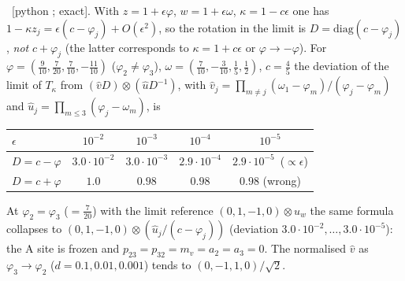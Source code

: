 \ex\ [python ; exact]. With $z=1+\epsilon\varphi$, $w=1+\epsilon\omega$, $\kappa=1-c\epsilon$ one has $1-\kappa z_j=\epsilon(c-\varphi_j)+O(\epsilon^2)$, so the rotation in the limit is $D=\mathrm{diag}(c-\varphi_j)$, \emph{not} $c+\varphi_j$
(the latter corresponds to $\kappa=1+c\epsilon$ or $\varphi\to-\varphi$). For $\varphi=(\tfrac9{10},\tfrac7{20},\tfrac7{10},-\tfrac{11}{10})$ ($\varphi_2\ne\varphi_3$), $\omega=(\tfrac7{10},-\tfrac3{10},\tfrac15,\tfrac12)$, $c=\tfrac45$ the deviation of the limit of $T_\kappa$ from
$(\hat vD)\otimes(\hat uD^{-1})$, with $\hat v_j=\prod_{m\ne j}(\omega_1-\varphi_m)/(\varphi_j-\varphi_m)$ and $\hat u_j=\prod_{m\le3}(\varphi_j-\omega_m)$, is
\begin{center}
\begin{tabular}{lcccc}
\toprule
$\epsilon$ & $10^{-2}$ & $10^{-3}$ & $10^{-4}$ & $10^{-5}$\\
\midrule
$D=c-\varphi$ & $3.0\cdot10^{-2}$ & $3.0\cdot10^{-3}$ & $2.9\cdot10^{-4}$ & $2.9\cdot10^{-5}$\ ($\propto\epsilon$)\\
$D=c+\varphi$ & $1.0$ & $0.98$ & $0.98$ & $0.98$ (wrong)\\
\bottomrule
\end{tabular}
\end{center}
At $\varphi_2=\varphi_3$ ($=\tfrac7{20}$) with the limit reference $(0,1,-1,0)\otimes u_w$ the same formula collapses to $(0,1,-1,0)\otimes(\hat u_j/(c-\varphi_j))$ (deviation $3.0\cdot10^{-2},\dots,3.0\cdot10^{-5}$): the A site is frozen and $p_{23}=p_{32}=m_v=a_2=a_3=0$. The normalised $\hat v$ as $\varphi_3\to\varphi_2$ ($d=0.1,0.01,0.001$) tends to $(0,-1,1,0)/\sqrt2$.
\endgroup
